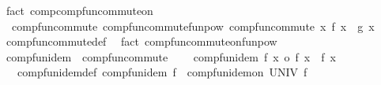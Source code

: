 \begin{isabellebody}
\ {\isacharparenleft}{\kern0pt}fact\ comp{\isacharunderscore}{\kern0pt}comp{\isacharunderscore}{\kern0pt}fun{\isacharunderscore}{\kern0pt}commute{\isacharunderscore}{\kern0pt}on{\isacharparenright}{\kern0pt}%
\endisatagproof
{\isafoldproof}%
%
\isadelimproof
\isanewline
%
\endisadelimproof
\isanewline
{}\isamarkupfalse%
\ {\isacharparenleft}{\kern0pt}\ comp{\isacharunderscore}{\kern0pt}fun{\isacharunderscore}{\kern0pt}commute{\isacharparenright}{\kern0pt}\ comp{\isacharunderscore}{\kern0pt}fun{\isacharunderscore}{\kern0pt}commute{\isacharunderscore}{\kern0pt}funpow{\isacharcolon}{\kern0pt}\ {\isachardoublequoteopen}comp{\isacharunderscore}{\kern0pt}fun{\isacharunderscore}{\kern0pt}commute\ {\isacharparenleft}{\kern0pt}{\isasymlambda}x{\isachardot}{\kern0pt}\ f\ x\ {\isacharcircum}{\kern0pt}{\isacharcircum}{\kern0pt}\ g\ x{\isacharparenright}{\kern0pt}{\isachardoublequoteclose}\isanewline
%
\isadelimproof
\ \ %
\endisadelimproof
%
\isatagproof
{}\isamarkupfalse%
\ comp{\isacharunderscore}{\kern0pt}fun{\isacharunderscore}{\kern0pt}commute{\isacharunderscore}{\kern0pt}def{\isacharprime}{\kern0pt}\ \isamarkupfalse%
\ {\isacharparenleft}{\kern0pt}fact\ comp{\isacharunderscore}{\kern0pt}fun{\isacharunderscore}{\kern0pt}commute{\isacharunderscore}{\kern0pt}on{\isacharunderscore}{\kern0pt}funpow{\isacharparenright}{\kern0pt}%
\endisatagproof
{\isafoldproof}%
%
\isadelimproof
\isanewline
%
\endisadelimproof
\isanewline
{}\isamarkupfalse%
\ comp{\isacharunderscore}{\kern0pt}fun{\isacharunderscore}{\kern0pt}idem\ {\isacharequal}{\kern0pt}\ comp{\isacharunderscore}{\kern0pt}fun{\isacharunderscore}{\kern0pt}commute\ {\isacharplus}{\kern0pt}\isanewline
\ \ \ comp{\isacharunderscore}{\kern0pt}fun{\isacharunderscore}{\kern0pt}idem{\isacharcolon}{\kern0pt}\ {\isachardoublequoteopen}f\ x\ o\ f\ x\ {\isacharequal}{\kern0pt}\ f\ x{\isachardoublequoteclose}\isanewline
{}\isanewline
\isanewline
{}\isamarkupfalse%
\ {\isacharparenleft}{\kern0pt}\ {\isacharminus}{\kern0pt}{\isacharparenright}{\kern0pt}\ comp{\isacharunderscore}{\kern0pt}fun{\isacharunderscore}{\kern0pt}idem{\isacharunderscore}{\kern0pt}def{\isacharprime}{\kern0pt}{\isacharcolon}{\kern0pt}\ {\isachardoublequoteopen}comp{\isacharunderscore}{\kern0pt}fun{\isacharunderscore}{\kern0pt}idem\ f\ {\isacharequal}{\kern0pt}\ comp{\isacharunderscore}{\kern0pt}fun{\isacharunderscore}{\kern0pt}idem{\isacharunderscore}{\kern0pt}on\ UNIV\ f{\isachardoublequoteclose}\isanewline
%

\end{isabellebody}
